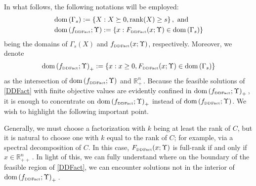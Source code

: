 \documentclass[smallextended]{svjour3hack}       %
\newcommand{\zc}[1]{\noindent{\color{red}[Zhongzhu:]\ {#1}}}
\newcommand{\mf}[1]{\noindent{\color{green}[Marcia:]\ {#1}}}
\DeclareMathOperator{\rank}{rank}
\DeclareMathOperator{\dom}{dom}
\begin{document}
In what follows, the following notations will be employed:
\begin{align*}
    &\dom\left(\Gamma_s\right):=  \left\{X : X\succeq 0, \rank(X)\ge s \right\}, \text{ and }\\
    &\dom\left(f_{{\tiny\mbox{DDFact}}}; \Upsilon\right):=  \left\{x : F_{{\tiny\mbox{DDFact}}}(x;\Upsilon)\in \dom \left(\Gamma_s\right)\right\}
\end{align*}
being the domains of $\Gamma_s(X)$ and $f_{{\tiny\mbox{DDFact}}}(x;\Upsilon)$, respectively. Moreover, we denote
\begin{align*}
   \dom\left(f_{{\tiny\mbox{DDFact}}}; \Upsilon\right)_+:=  \left\{x : x\ge 0,  F_{{\tiny\mbox{DDFact}}}(x;\Upsilon)\in \dom \left(\Gamma_s\right)\right\}
\end{align*}
as the intersection of $\dom\left(f_{{\tiny\mbox{DDFact}}}; \Upsilon\right)$ and $\mathbb{R}^n_+$\,. Because the feasible solutions of \ref{DDFact} with finite objective values
are evidently confined in $\dom\left(f_{{\tiny\mbox{DDFact}}}; \Upsilon\right)_+$\,, it is enough to concentrate on $\dom\left(f_{{\tiny\mbox{DDFact}}}; \Upsilon\right)_+$ instead of $\dom\left(f_{{\tiny\mbox{DDFact}}}; \Upsilon\right)$.%
We wish to highlight the following important point.




\begin{remark}\label{rem:fullrank}
    Generally, we must choose a factorization with $k$ being at least the rank of $C$, but it is natural to choose one with $k$ equal to the rank of $C$;
    for example, via a spectral decomposition of $C$.
    In this case, $F_{{\tiny\mbox{DDFact}}}(x;\Upsilon)$ is full-rank if and only if $x\in\mathbb{R}^n_{++}$\,.
    In light of this, we can fully understand where on the boundary of the feasible region of \ref{DDFact}, we can encounter solutions not in
    the interior of $\dom\left(f_{{\tiny\mbox{DDFact}}}; \Upsilon\right)_+$\,.
\end{remark}
\end{document}
